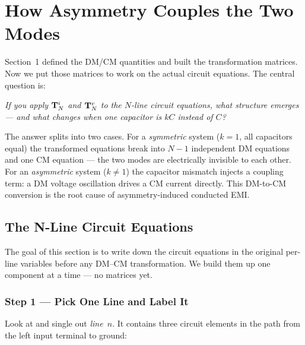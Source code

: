 \section{How Asymmetry Couples the Two Modes}

Section~1 defined the DM/CM quantities and built the transformation
matrices.  Now we put those matrices to work on the actual circuit
equations.  The central question is:

\begin{center}
\emph{If you apply $\mathbf{T}^{i}_{N}$ and $\mathbf{T}^{v}_{N}$ to the $N$-line circuit
equations, what structure emerges — and what changes when one
capacitor is $kC$ instead of $C$?}
\end{center}

The answer splits into two cases.  For a \emph{symmetric} system
($k = 1$, all capacitors equal) the transformed equations break
into $N-1$ independent DM equations and one CM equation — the two
modes are electrically invisible to each other.  For an
\emph{asymmetric} system ($k \neq 1$) the capacitor mismatch
injects a coupling term: a DM voltage oscillation drives a CM
current directly.  This DM-to-CM conversion is the root cause of
asymmetry-induced conducted EMI.

\subsection{The N-Line Circuit Equations}

The goal of this section is to write down the circuit equations in
the original per-line variables before any DM--CM transformation.
We build them up one component at a time — no matrices yet.

\subsubsection*{Step 1 — Pick One Line and Label It}

Look at  and single out \emph{line~$n$}.
It contains three circuit elements in the path from the left input
terminal to ground:

